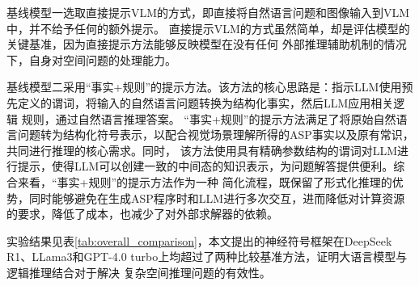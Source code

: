 基线模型一选取直接提示VLM的方式，即直接将自然语言问题和图像输入到VLM中，并不给予任何的额外提示。
直接提示VLM的方式虽然简单，却是评估模型的关键基准，因为直接提示方法能够反映模型在没有任何
外部推理辅助机制的情况下，自身对空间问题的处理能力。

基线模型二采用“事实+规则”的提示方法。该方法的核心思路是：指示LLM使用预先定义的谓词，将输入的自然语言问题转换为结构化事实，然后LLM应用相关逻辑
规则，通过自然语言推理答案。
“事实+规则”的提示方法满足了将原始自然语言问题转为结构化符号表示，以配合视觉场景理解所得的ASP事实以及原有常识，共同进行推理的核心需求。同时，
该方法使用具有精确参数结构的谓词对LLM进行提示，使得LLM可以创建一致的中间态的知识表示，为问题解答提供便利。综合来看，“事实+规则”的提示方法作为一种
简化流程，既保留了形式化推理的优势，同时能够避免在生成ASP程序时和LLM进行多次交互，进而降低对计算资源的要求，降低了成本，也减少了对外部求解器的依赖。

实验结果见表\ref{tab:overall_comparison}，本文提出的神经符号框架在DeepSeek R1、LLama3和GPT-4.0 turbo上均超过了两种比较基准方法，证明大语言模型与逻辑推理结合对于解决
复杂空间推理问题的有效性。

\begin{table}[h]
    \centering
    \small  %
    \renewcommand{\arraystretch}{1.2}  %
    \setlength{\tabcolsep}{5pt}  %
    \caption{不同模型及方法在各问题类型上的表现}
    \label{tab:overall_comparison}
\end{table}

